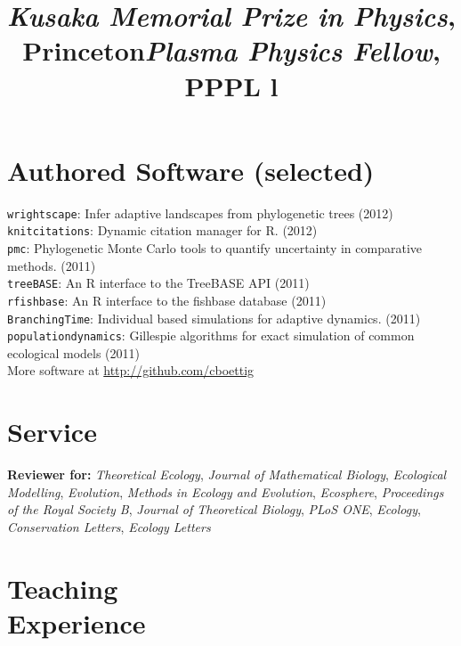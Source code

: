 \documentclass[margin]{res}
\begin{document}
\begin{resume}
\title{\emph{Kusaka Memorial Prize in Physics}, Princeton}
\begin{position}   \vspace{-.7cm} \end{position}

\title{\emph{Plasma Physics Fellow},  PPPL }
\begin{position}   \vspace{-.7cm} \end{position}


\section{Authored Software (selected)} 
{ \footnotesize
\texttt{wrightscape}: Infer adaptive landscapes from phylogenetic trees (2012) \\
\texttt{knitcitations}: Dynamic citation manager for R. (2012) \\
\texttt{pmc}: Phylogenetic Monte Carlo tools to quantify uncertainty in comparative methods. (2011)\\
\texttt{treeBASE}: An R interface to the TreeBASE API (2011) \\
\texttt{rfishbase}: An R interface to the fishbase database (2011) \\
\texttt{BranchingTime}: Individual based simulations for adaptive dynamics. (2011) \\
\texttt{populationdynamics}: Gillespie algorithms for exact simulation of common ecological models (2011) \\ 
More software at \href{http://github.com/cboettig}{http://github.com/cboettig}
}

\section{Service}

\textbf{Reviewer for:}   \emph{Theoretical Ecology}, \emph{Journal of Mathematical Biology}, \emph{Ecological Modelling},
\emph{Evolution}, \emph{Methods in Ecology and Evolution}, \emph{Ecosphere}, \emph{Proceedings of the Royal Society B}, \emph{Journal of Theoretical Biology}, \emph{PLoS ONE}, \emph{Ecology}, \emph{Conservation Letters}, \emph{Ecology Letters} 


\section{Teaching\\Experience}
\begin{format}
\title{l}\\
\body
\end{format}


\end{resume}
\end{document}
